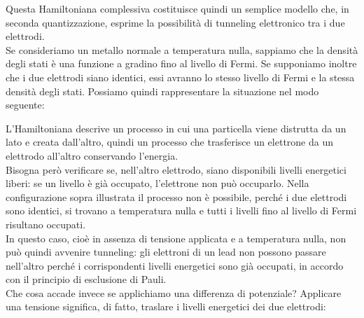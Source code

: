 Questa Hamiltoniana complessiva costituisce quindi un semplice modello che, in seconda quantizzazione, esprime la possibilità di tunneling elettronico tra i due elettrodi.\\
Se consideriamo un metallo normale a temperatura nulla, sappiamo che la densità degli stati è una funzione a gradino fino al livello di Fermi. Se supponiamo inoltre che i due elettrodi siano identici, essi avranno lo stesso livello di Fermi e la stessa densità degli stati. Possiamo quindi rappresentare la situazione nel modo seguente:
\begin{figure}[H]
    \centering
\end{figure}
\hspace{-0.6cm}L'Hamiltoniana descrive un processo in cui una particella viene distrutta da un lato e creata dall'altro, quindi un processo che trasferisce un elettrone da un elettrodo all'altro conservando l'energia.\\
Bisogna però verificare se, nell'altro elettrodo, siano disponibili livelli energetici liberi: se un livello è già occupato, l'elettrone non può occuparlo. Nella configurazione sopra illustrata il processo non è possibile, perché i due elettrodi sono identici, si trovano a temperatura nulla e tutti i livelli fino al livello di Fermi risultano occupati.\\
In questo caso, cioè in assenza di tensione applicata e a temperatura nulla, non può quindi avvenire tunneling: gli elettroni di un lead non possono passare nell'altro perché i corrispondenti livelli energetici sono già occupati, in accordo con il principio di esclusione di Pauli.\\
Che cosa accade invece se applichiamo una differenza di potenziale? Applicare una tensione significa, di fatto, traslare i livelli energetici dei due elettrodi:
\begin{figure}[H]
    \centering
\end{figure}
